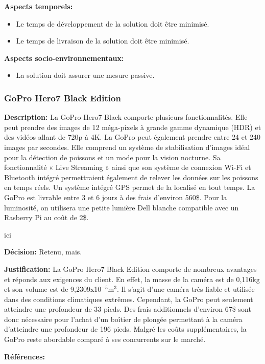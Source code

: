 \textbf{Aspects temporels:}
\begin{itemize}[label = {--}]
    \item Le temps de développement de la solution doit être minimisé.
    \item Le temps de livraison de la solution doit être minimisé.
\end{itemize}

\textbf{Aspects socio-environnementaux:}
\begin{itemize}[label = {--}]
    \item La solution doit assurer une mesure passive.
\end{itemize}

\subsubsection{GoPro Hero7 Black Edition}

\textbf{Description:} La GoPro Hero7 Black comporte plusieurs fonctionnalités. Elle peut prendre des images de 12 méga-pixels à grande gamme dynamique (HDR) et des vidéos allant de 720p à 4K. La GoPro peut également prendre entre 24 et 240 images par secondes. Elle comprend un système de stabilisation d'images idéal pour la détection de poissons et un mode pour la vision nocturne. Sa fonctionnalité « Live Streaming » ainsi que son système de connexion Wi-Fi et Bluetooth intégré permettraient également de relever les données sur les poissons en temps réels. Un système intégré GPS permet de la localisé en tout temps. La GoPro est livrable entre 3 et 6 jours à des frais d'environ 560\$. Pour la luminosité, on utilisera une petite lumière Dell blanche compatible avec un Rasberry Pi au coût de 2\$.

ici

\textbf{Décision:} Retenu, mais.

\textbf{Justification:} La GoPro Hero7 Black Edition comporte de nombreux avantages et réponds aux exigences du client. En effet, la masse de la caméra est de 0,116kg et son volume est de 9,2309x10$^{-5}$m$^3$. Il s'agit d'une caméra très fiable et utilisée dans des conditions climatiques extrêmes. Cependant, la GoPro peut seulement atteindre une profondeur de 33 pieds. Des frais additionnels d'environ 67\$ sont donc nécessaire pour l'achat d'un boîtier de plongée permettant à la caméra d'atteindre une profondeur de 196 pieds. Malgré les coûts supplémentaires, la GoPro reste abordable comparé à ses concurrents sur le marché.

\textbf{Références:} \cite{GoPro_Specs} \cite{GoPro_Waterproof}


